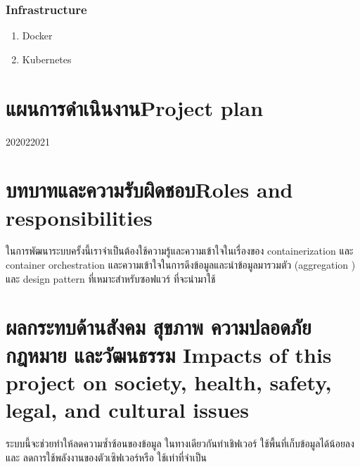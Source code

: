 \subsubsection{Infrastructure}
\begin{enumerate}
    \item Docker \cite {docker}
    \item Kubernetes \cite {kubernetes}
\end{enumerate}

\section{\ifcpe แผนการดำเนินงาน\else Project plan\fi}
\begin{plan}{6}{2020}{2}{2021}
\end{plan}

\section{\ifcpe บทบาทและความรับผิดชอบ\else Roles and responsibilities\fi}
ในการพัฒนาระบบครั้งนี้เราจำเป็นต้องใช้ความรู้และความเข้าใจในเรื่องของ containerization \cite{containerization} และ container orchestration \cite{orchestration} และความเข้าใจในการดึงข้อมูลและนำข้อมูลมารวมตัว (aggregation \cite{aggregation}) และ design pattern ที่เหมาะสำหรับซอฟแวร์ ที่จะนำมาใช้

\section{\ifcpe%
ผลกระทบด้านสังคม สุขภาพ ความปลอดภัย กฎหมาย และวัฒนธรรม
\else%
Impacts of this project on society, health, safety, legal, and cultural issues
\fi}

ระบบนี้จะช่วยทำให้ลดความซ้ำซ้อนของข้อมูล ในทางเดียวกันทำเชิฟเวอร์ ใช้พื้นที่เก็บข้อมูลได้น้อยลง และ ลดการใช้พลังงานของตัวเซิฟเวอร์หรือ ใช้เท่าที่จำเป็น